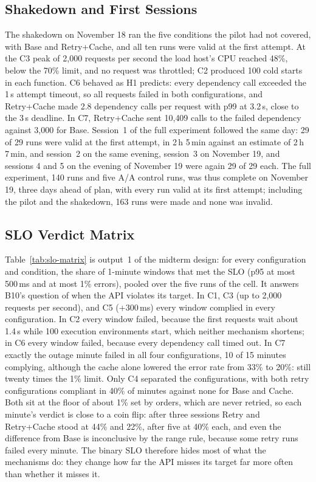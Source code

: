 \documentclass[10pt]{article}
\begin{document}
\subsection{Shakedown and First Sessions}
The shakedown on November 18 ran the five conditions the pilot had not
covered, with Base and Retry+Cache, and all ten runs were valid at the first
attempt. At the C3 peak of 2{,}000 requests per second the load host's CPU
reached 48\%, below the 70\% limit, and no request was throttled; C2 produced
100 cold starts in each function. C6 behaved as H1 predicts: every dependency
call exceeded the 1\,s attempt timeout, so all requests failed in both
configurations, and Retry+Cache made 2.8 dependency calls per request with p99
at 3.2\,s, close to the 3\,s deadline. In C7, Retry+Cache sent 10{,}409 calls to
the failed dependency against 3{,}000 for Base. Session~1 of the full
experiment followed the same day: 29 of 29 runs were valid at the first
attempt, in 2\,h 5\,min against an estimate of 2\,h 7\,min, and session~2 on the
same evening, session~3 on November 19, and sessions 4 and 5 on the evening of
November 19 were again 29 of 29 each. The full experiment, 140 runs and five A/A
control runs, was thus complete on November 19, three days ahead of plan, with
every run valid at its first attempt; including the pilot and the shakedown,
163 runs were made and none was invalid.

\subsection{SLO Verdict Matrix}
Table~\ref{tab:slo-matrix} is output~1 of the midterm design: for every
configuration and condition, the share of 1-minute windows that met the SLO
(p95 at most 500\,ms and at most 1\% errors), pooled over the five runs of the
cell. It answers B10's question of when the API violates its target. In C1, C3
(up to 2{,}000 requests per second), and C5 (+300\,ms) every window complied in
every configuration. In C2 every window failed, because the first requests wait
about 1.4\,s while 100 execution environments start, which neither mechanism
shortens; in C6 every window failed, because every dependency call timed out. In
C7 exactly the outage minute failed in all four configurations, 10 of 15 minutes
complying, although the cache alone lowered the error rate from 33\% to 20\%:
still twenty times the 1\% limit. Only C4 separated the configurations, with
both retry configurations compliant in 40\% of minutes against none for Base
and Cache. Both sit at the floor of about 1\% set by orders, which are never
retried, so each minute's verdict is close to a coin flip: after three sessions
Retry and Retry+Cache stood at 44\% and 22\%, after five at 40\% each, and even
the difference from Base is inconclusive by the range rule, because some retry
runs failed every minute. The binary SLO therefore hides most of what the
mechanisms do: they change how far the API misses its target far more often
than whether it misses it.
\end{document}
